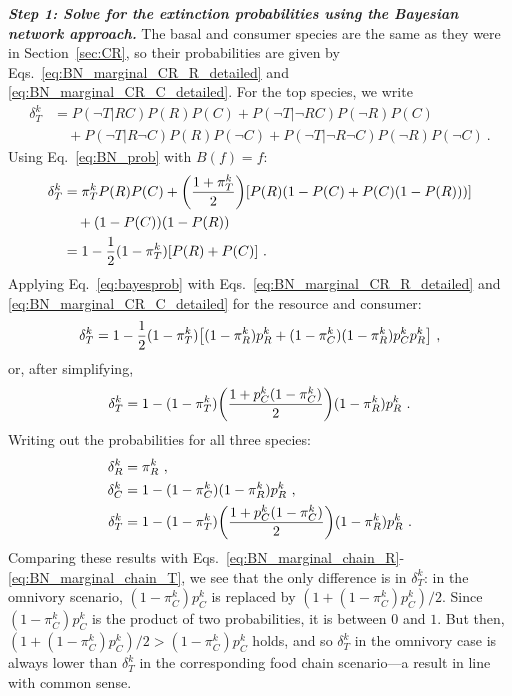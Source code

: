 \documentclass[11pt]{article}
\let\originalleft\left
\let\originalright\right
\renewcommand{\left}{\mathopen{}\mathclose\bgroup\originalleft}
\renewcommand{\right}{\aftergroup\egroup\originalright}
\begin{document}
\textit{\textbf{Step 1: Solve for the extinction probabilities using the Bayesian network approach.}}
The basal and consumer species are the same as they were in Section~\ref{sec:CR}, so their probabilities are given by Eqs.~\ref{eq:BN_marginal_CR_R_detailed} and \ref{eq:BN_marginal_CR_C_detailed}. For the top species, we write
\begin{equation}
  \label{eq:BN_marginal_omniv}
  \begin{split}
    \delta_T^k &= P(\neg T|R C) P(R) P(C) + P(\neg T|\neg R C) P(\neg
    R) P(C) \\ &\quad + P(\neg T|R \neg C) P(R) P(\neg C) +
    P(\neg T|\neg R \neg C) P(\neg R) P(\neg C) \ .
  \end{split}
\end{equation}
Using Eq.~\ref{eq:BN_prob} with $B(f)=f$:
\begin{equation}
  \label{eq:BN_marginal_omniv_2}
  \begin{split}
    \delta_T^k &= \pi_T^k P(R) P(C) + \left( \frac{1 + \pi_T^k}{2} \right)
    \left[ P(R) (1-P(C) + P(C) (1-P(R))) \right] \\ &\quad + (1-P(C)) (1-P(R))
    \\ &= 1 - \frac{1}{2} (1 - \pi_T^k) \left[ P(R) + P(C) \right] \ .
  \end{split}
\end{equation}
Applying Eq.~\ref{eq:bayesprob} with Eqs.~\ref{eq:BN_marginal_CR_R_detailed} and \ref{eq:BN_marginal_CR_C_detailed} for the resource and consumer:
\begin{equation}
  \label{eq:BN_marginal_omniv_3}
  \delta_T^k = 1 - \frac{1}{2} (1 - \pi_T^k) \left[ (1-\pi_R^k) p_R^k +
    (1-\pi_C^k) (1-\pi_R^k) p_C^k p_R^k \right] \ ,
\end{equation}
or, after simplifying,
\begin{equation}
  \label{eq:BN_marginal_omniv_4}
  \delta_T^k = 1 - (1 - \pi_T^k) \left( \frac{1 + p_C^k (1-\pi_C^k)}{2} \right)
  (1-\pi_R^k) p_R^k \ .
\end{equation}
Writing out the probabilities for all three species:
\begin{align}
  \label{eq:BN_marginal_omniv_R}
  \delta_R^k &= \pi_R^k \ , \\
  \label{eq:BN_marginal_omniv_C}
  \delta_C^k & = 1 - (1-\pi_C^k) (1-\pi_R^k) p_R^k \ , \\
  \label{eq:BN_marginal_omniv_T}
  \delta_T^k &= 1 - (1 - \pi_T^k) \left( \frac{1 + p_C^k (1-\pi_C^k)}{2} \right)
               (1-\pi_R^k) p_R^k \ .
\end{align}
Comparing these results with Eqs.~\ref{eq:BN_marginal_chain_R}-\ref{eq:BN_marginal_chain_T}, we see that the only difference is in $\delta_T^k$: in the omnivory scenario, $(1 - \pi_C^k) p_C^k$ is replaced by $(1 + (1 - \pi_C^k) p_C^k) / 2$. Since $(1 - \pi_C^k) p_C^k$ is the product of two probabilities, it is between $0$ and $1$. But then, $(1 + (1 - \pi_C^k) p_C^k) / 2 > (1 - \pi_C^k) p_C^k$ holds, and so $\delta_T^k$ in the omnivory case is always lower than $\delta_T^k$ in the corresponding food chain scenario---a result in line with common sense.
\end{document}
